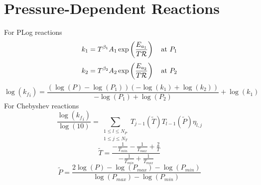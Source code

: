 \documentclass[a4paper,10pt]{article}
\newcommand{\Ru}{\mathcal{R}}
\begin{document}
\section{Pressure-Dependent Reactions}
For PLog reactions
\begin{dmath} k_{1}=T^{\beta_1} A_{1} \operatorname{exp}\left({\frac{E_{a_1}}{T \Ru}}\right)\text{\quad at $P_1$}\end{dmath} 
\begin{dmath} k_{2}=T^{\beta_2} A_{2} \operatorname{exp}\left({\frac{E_{a_2}}{T \Ru}}\right)\text{\quad at $P_2$}\end{dmath} 
\begin{dmath} \log{\left ({k_f}_{i} \right )} = \frac{\left(\log{\left (P \right )} - \log{\left (P_{1} \right )}\right) \left(- \log{\left (k_{1} \right )} + \log{\left (k_{2} \right )}\right)}{- \log{\left (P_{1} \right )} + \log{\left (P_{2} \right )}} + \log{\left (k_{1} \right )}\end{dmath} 
For Chebyshev reactions
\begin{dmath} \frac{\log{\left ({k_f}_{i} \right )}}{\log{\left (10 \right )}} = \sum_{\substack{1 \leq l \leq N_{P}\\1 \leq j \leq N_{T}}} T_{j - 1}\left(\tilde{T}\right) T_{l - 1}\left(\tilde{P}\right) \eta_{l,j}\end{dmath} 
\begin{dmath} \tilde{T} = \frac{- \frac{1}{T_{min}} - \frac{1}{T_{max}} + \frac{2}{T}}{- \frac{1}{T_{min}} + \frac{1}{T_{max}}}\end{dmath} 
\begin{dmath} \tilde{P} = \frac{2 \log{\left (P \right )} - \log{\left (P_{max} \right )} - \log{\left (P_{min} \right )}}{\log{\left (P_{max} \right )} - \log{\left (P_{min} \right )}}\end{dmath} 
\end{document}
